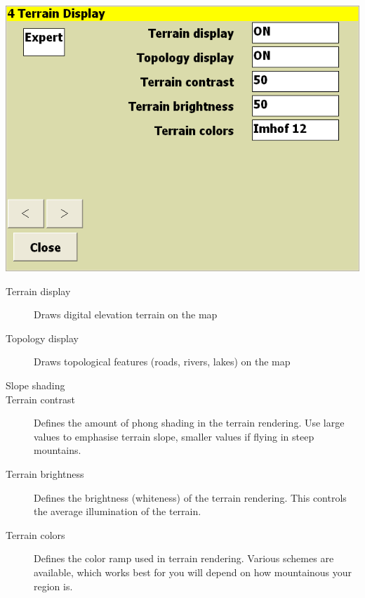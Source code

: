 \documentclass[a4paper,12pt]{refrep}
\begin{document}
\begin{center}
\includegraphics[angle=0,width=\linewidth,keepaspectratio='true']{figures/config-t.png}
\end{center}

\begin{description}
\item[Terrain display] Draws digital elevation terrain on the map
\item[Topology display] Draws topological features (roads, rivers, lakes) on the map
\item[Slope shading]  
\item[Terrain contrast]  Defines the amount of phong shading in the terrain rendering.  Use large values 
to emphasise terrain slope, smaller values if flying in steep mountains.
\item[Terrain brightness]  Defines the brightness (whiteness) of the terrain rendering.  This controls the 
average illumination of the terrain.
\item[Terrain colors]  Defines the color ramp used in terrain rendering.  Various schemes are available, 
which works best for you will depend on how mountainous your region is.
\end{description}
\end{document}
